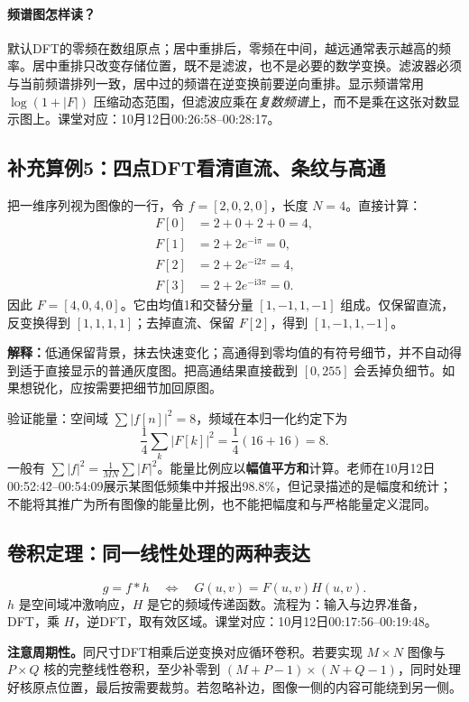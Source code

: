 \paragraph{频谱图怎样读？}
默认DFT的零频在数组原点；居中重排后，零频在中间，越远通常表示越高的频率。居中重排只改变存储位置，既不是滤波，也不是必要的数学变换。滤波器必须与当前频谱排列一致，居中过的频谱在逆变换前要逆向重排。显示频谱常用 $\log(1+|F|)$ 压缩动态范围，但滤波应乘在\emph{复数频谱}上，而不是乘在这张对数显示图上。课堂对应：10月12日00:26:58--00:28:17。

\subsection{补充算例5：四点DFT看清直流、条纹与高通}
把一维序列视为图像的一行，令 $f=[2,0,2,0]$，长度 $N=4$。直接计算：
\[
\begin{aligned}
F[0]&=2+0+2+0=4,\\
F[1]&=2+2e^{-\mathrm i\pi}=0,\\
F[2]&=2+2e^{-\mathrm i2\pi}=4,\\
F[3]&=2+2e^{-\mathrm i3\pi}=0.
\end{aligned}
\]
因此 $F=[4,0,4,0]$。它由均值1和交替分量 $[1,-1,1,-1]$ 组成。仅保留直流，反变换得到 $[1,1,1,1]$；去掉直流、保留 $F[2]$，得到 $[1,-1,1,-1]$。

\textbf{解释：}低通保留背景，抹去快速变化；高通得到零均值的有符号细节，并不自动得到适于直接显示的普通灰度图。把高通结果直接截到 $[0,255]$ 会丢掉负细节。如果想锐化，应按需要把细节加回原图。

验证能量：空间域 $\sum|f[n]|^2=8$，频域在本归一化约定下为
\[
\frac14\sum_k|F[k]|^2=\frac14(16+16)=8.
\]
一般有 $\sum|f|^2=\frac1{MN}\sum|F|^2$。能量比例应以\textbf{幅值平方和}计算。老师在10月12日00:52:42--00:54:09展示某图低频集中并报出98.8\%，但记录描述的是幅度和统计；不能将其推广为所有图像的能量比例，也不能把幅度和与严格能量定义混同。

\subsection{卷积定理：同一线性处理的两种表达}
\[
g=f*h\quad\Longleftrightarrow\quad G(u,v)=F(u,v)H(u,v).
\]
$h$ 是空间域冲激响应，$H$ 是它的频域传递函数。流程为：输入与边界准备，DFT，乘 $H$，逆DFT，取有效区域。课堂对应：10月12日00:17:56--00:19:48。

\textbf{注意周期性。}同尺寸DFT相乘后逆变换对应循环卷积。若要实现 $M\times N$ 图像与 $P\times Q$ 核的完整线性卷积，至少补零到 $(M+P-1)\times(N+Q-1)$，同时处理好核原点位置，最后按需要裁剪。若忽略补边，图像一侧的内容可能绕到另一侧。

